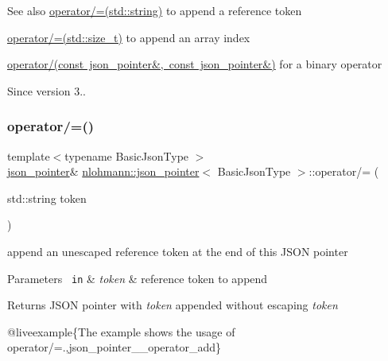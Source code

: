 \begin{DoxySeeAlso}{See also}
\mbox{\hyperlink{classnlohmann_1_1json__pointer_abdd21567b2b1d69329af0f520335e68b}{operator/=(std\+::string)}} to append a reference token 

\mbox{\hyperlink{classnlohmann_1_1json__pointer_a64c8401529131bad1e486d91d703795f}{operator/=(std\+::size\+\_\+t)}} to append an array index 

\mbox{\hyperlink{classnlohmann_1_1json__pointer_a90a11fe6c7f37b1746a3ff9cb24b0d53}{operator/(const json\+\_\+pointer\&, const json\+\_\+pointer\&)}} for a binary operator
\end{DoxySeeAlso}
\begin{DoxySince}{Since}
version 3.. 
\end{DoxySince}
\mbox{\label{classnlohmann_1_1json__pointer_abdd21567b2b1d69329af0f520335e68b}} 
\subsubsection{\texorpdfstring{operator/=()}{operator/=()}\hspace{0.1cm}{\footnotesize\ttfamily [2/3]}}
{\footnotesize\ttfamily template$<$typename Basic\+Json\+Type $>$ \\
\mbox{\hyperlink{classnlohmann_1_1json__pointer}{json\+\_\+pointer}}\& \mbox{\hyperlink{classnlohmann_1_1json__pointer}{nlohmann\+::json\+\_\+pointer}}$<$ Basic\+Json\+Type $>$\+::operator/= (\begin{DoxyParamCaption}\item[{std\+::string}]{token }\end{DoxyParamCaption})\hspace{0.3cm}{\ttfamily [inline]}}



append an unescaped reference token at the end of this J\+S\+ON pointer 


\begin{DoxyParams}[1]{Parameters}
\mbox{\texttt{ in}}  & {\em token} & reference token to append \\
\hline
\end{DoxyParams}
\begin{DoxyReturn}{Returns}
J\+S\+ON pointer with {\itshape token} appended without escaping {\itshape token} 
\end{DoxyReturn}
@liveexample\{The example shows the usage of {\ttfamily operator/=}.,json\+\_\+pointer\+\_\+\+\_\+operator\+\_\+add\}

